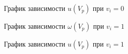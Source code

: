 \begin{figure}[H]
	\renewcommand{\figurename}{Рисунок}
	\caption{График зависимости $u(V_p)$ при $v_i = 0$}
	\label{img:6}
\end{figure}

\begin{figure}[H]
	\renewcommand{\figurename}{Рисунок}
	\caption{График зависимости $\omega(V_p)$ при $v_i = 1$}
	\label{img:7}
\end{figure}

\begin{figure}[H]
	\renewcommand{\figurename}{Рисунок}
	\caption{График зависимости $u(V_p)$ при $v_i = 1$}
	\label{img:8}
\end{figure}

\newpage



